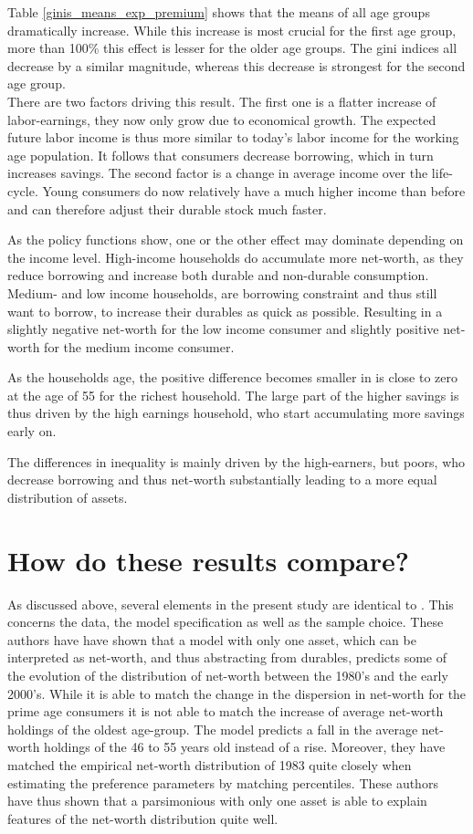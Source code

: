 \documentclass[a4paper,12pt,legno]{article}
\begin{document}
Table \ref{ginis_means_exp_premium} shows that the means of all age groups dramatically increase. While this increase is most crucial for the first age group, more than 100\% this effect is lesser for the older age groups. The gini indices all decrease by a similar magnitude, whereas this decrease is strongest for the second age group. \\

There are two factors driving this result. The first one is a flatter increase of labor-earnings, they now only grow due to economical growth. The expected future labor income is thus more similar to today's labor income for the working age population. It follows that consumers decrease borrowing, which in turn increases savings. The second factor is a change in average income over the life-cycle. Young consumers do now relatively have a much higher income than before and can therefore adjust their durable stock much faster. 

As the policy functions show, one or the other effect may dominate depending on the income level. High-income households do accumulate more net-worth, as they reduce borrowing and increase both durable and non-durable consumption. Medium- and low income households, are borrowing constraint and thus still want to borrow, to increase their durables as quick as possible. Resulting in a slightly negative net-worth for the low income consumer and slightly positive net-worth for the medium income consumer. 

As the households age, the positive difference becomes smaller in is close to zero at the age of 55 for the richest household. 
The large part of the higher savings is thus driven by the high earnings household, who start accumulating more savings early on. 

The differences in inequality is mainly driven by the high-earners, but poors, who decrease borrowing and thus net-worth substantially leading to a more equal distribution of assets. 

\section{How do these results compare?} As discussed above, several elements in the present study are identical to \cite{hintermaier2011}. This concerns the data, the model specification as well as the sample choice. These authors have have shown that a model with only one asset, which can be interpreted as net-worth, and thus abstracting from durables, predicts some of the evolution of the distribution of net-worth between the 1980's and the early 2000's. While it is able to match the change in the dispersion in net-worth for the prime age consumers it is not able to match the increase of average net-worth holdings of the oldest age-group. The model predicts a fall in the average net-worth holdings of the 46 to 55 years old instead of a rise. Moreover, they have matched the empirical net-worth distribution of 1983 quite closely when estimating the preference parameters by matching percentiles. These authors have thus shown that a parsimonious with only one asset is able to explain features of the net-worth distribution quite well. 
\end{document}
